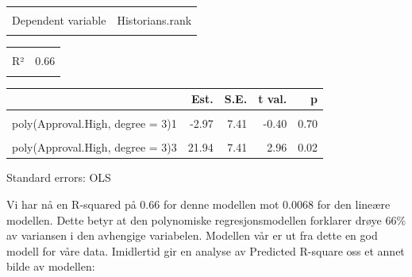 \documentclass[
]{article}
\begin{document}
\begin{table}[!h]
\centering
\begin{tabular}{lr}
\toprule
\cellcolor{gray!6}{Observations} & \cellcolor{gray!6}{12}\\
Dependent variable & Historians.rank\\
\cellcolor{gray!6}{Type} & \cellcolor{gray!6}{OLS linear regression}\\
\bottomrule
\end{tabular}
\end{table} \begin{table}[!h]
\centering
\begin{tabular}{lr}
\toprule
\cellcolor{gray!6}{F(3,8)} & \cellcolor{gray!6}{5.27}\\
R² & 0.66\\
\cellcolor{gray!6}{Adj. R²} & \cellcolor{gray!6}{0.54}\\
\bottomrule
\end{tabular}
\end{table} \begin{table}[!h]
\centering
\begin{threeparttable}
\begin{tabular}{lrrrr}
\toprule
  & Est. & S.E. & t val. & p\\
\midrule
\cellcolor{gray!6}{(Intercept)} & \cellcolor{gray!6}{17.00} & \cellcolor{gray!6}{2.14} & \cellcolor{gray!6}{7.95} & \cellcolor{gray!6}{0.00}\\
poly(Approval.High, degree = 3)1 & -2.97 & 7.41 & -0.40 & 0.70\\
\cellcolor{gray!6}{poly(Approval.High, degree = 3)2} & \cellcolor{gray!6}{19.41} & \cellcolor{gray!6}{7.41} & \cellcolor{gray!6}{2.62} & \cellcolor{gray!6}{0.03}\\
poly(Approval.High, degree = 3)3 & 21.94 & 7.41 & 2.96 & 0.02\\
\bottomrule
\end{tabular}
\begin{tablenotes}
\item Standard errors: OLS
\end{tablenotes}
\end{threeparttable}
\end{table}

Vi har nå en R-squared på \(0.66\) for denne modellen mot \(0.0068\) for den lineære modellen. Dette betyr at den polynomiske regresjonsmodellen forklarer drøye 66\% av variansen i den avhengige variabelen. Modellen vår er ut fra dette en god modell for våre data.
Imidlertid gir en analyse av Predicted R-square oss et annet bilde av modellen:
\end{document}
